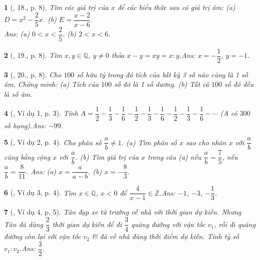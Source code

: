 \documentclass{article}
\newtheorem{baitoan}{}
\begin{document}
\begin{baitoan}[\cite{Tuyen_Toan_7}, 18., p. 8]
	Tìm các giá trị của $x$ để các biểu thức sau có giá trị âm: (a) $D = x^2 - \dfrac{2}{5}x$. (b) $E = \dfrac{x - 2}{x - 6}$.\\\mbox{}\hfill{\sf Ans: (a) $0 < x < \dfrac{2}{5}$. (b) $2 < x < 6$.}
\end{baitoan}

\begin{baitoan}[\cite{Tuyen_Toan_7}, 19., p. 8]
	Tìm $x,y\in\mathbb{Q}$, $y\ne 0$ thỏa $x - y = xy = x:y$.\hfill{\sf Ans: $x = -\dfrac{1}{2}$, $y = -1$.}
\end{baitoan}

\begin{baitoan}[\cite{Tuyen_Toan_7}, 20., p. 8]
	Cho $100$ số hữu tỷ trong đó tích của bất kỳ 3 số nào cũng là 1 số âm. Chứng minh: (a) Tích của $100$ số đó là 1 số dương. (b) Tất cả $100$ số đó đều là số âm.	
\end{baitoan}

\begin{baitoan}[\cite{Binh_Toan_7_tap_1}, Ví dụ 1, p. 3]
	Tính $A = \dfrac{1}{2} - \dfrac{1}{3} - \dfrac{1}{6} - \dfrac{1}{2} - \dfrac{1}{3} - \dfrac{1}{6} - \dfrac{1}{2} - \dfrac{1}{3} - \dfrac{1}{6} - \cdots$ ($A$ có $300$ số hạng).\hfill{\sf Ans: $-99$.}
\end{baitoan}

\begin{baitoan}[\cite{Binh_Toan_7_tap_1}, Ví dụ 2, p. 4]
	Cho phân số $\dfrac{a}{b}\ne 1$.	(a) Tìm phân số $x$ sao cho nhân $x$ với $\dfrac{a}{b}$ cũng bằng cộng $x$ với $\dfrac{a}{b}$. (b) Tìm giá trị của $x$ trong câu (a) nếu $\dfrac{a}{b} = \dfrac{7}{5}$, nếu $\dfrac{a}{b} = \dfrac{8}{11}$. \hfill{\sf Ans: (a) $x = \dfrac{a}{a - b}$. (b) $x = -\dfrac{8}{3}$.}
\end{baitoan}

\begin{baitoan}[\cite{Binh_Toan_7_tap_1}, Ví dụ 3, p. 4]
	Tìm $x\in\mathbb{Q}$, $x < 0$ để $\dfrac{4}{x - 1}\in\mathbb{Z}$.\hfill{\sf Ans: $-1$, $-3$, $-\dfrac{1}{3}$.}
\end{baitoan}

\begin{baitoan}[\cite{Binh_Toan_7_tap_1}, Ví dụ 4, p. 5]
	Tân đạp xe từ trường về nhà với thời gian dự kiến. Nhưng Tân đã dùng $\dfrac{2}{3}$ thời gian dự kiến để đi $\dfrac{3}{4}$ quãng đường với vận tốc $v_1$, rồi đi quãng đường còn lại với vận tốc $v_2$ \& đã về nhà đúng thời điểm dự kiến. Tính tỷ số $v_1:v_2$.\hfill{\sf Ans: $\dfrac{3}{2}$.}
\end{baitoan}
\end{document}
